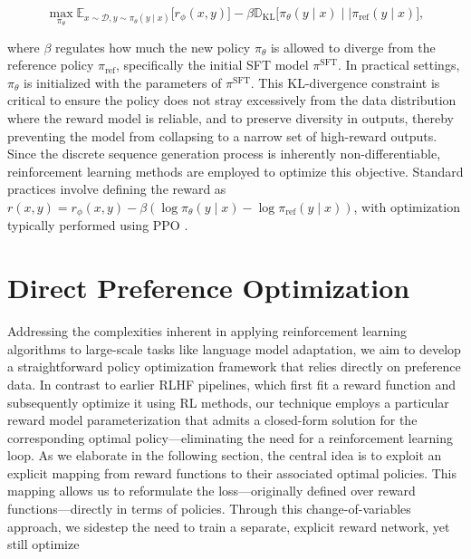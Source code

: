 \begin{equation}\label{eq:RL}
\max_{\pi_{\theta}}  \mathbb{E}_{x\sim \mathcal{D}, y\sim \pi_{\theta}(y \mid x)}\bigl[r_{\phi}(x, y)\bigr] - \beta\mathbb{D}_{\textrm{KL}}\bigl[\pi_{\theta}(y\mid x)\mid \mid \pi_\text{ref}(y\mid x)\bigr],
\end{equation}

where $\beta$ regulates how much the new policy $\pi_\theta$ is allowed to diverge from the reference policy $\pi_\text{ref}$, specifically the initial SFT model $\pi^\text{SFT}$. In practical settings, $\pi_\theta$ is initialized with the parameters of $\pi^\text{SFT}$. This KL-divergence constraint is critical to ensure the policy does not stray excessively from the data distribution where the reward model is reliable, and to preserve diversity in outputs, thereby preventing the model from collapsing to a narrow set of high-reward outputs. Since the discrete sequence generation process is inherently non-differentiable, reinforcement learning methods are employed to optimize this objective. Standard practices \citep{ziegler2020finetuning, stiennon2022learning, bai2022training, ouyang2022training} involve defining the reward as ${r(x, y) = r_{\phi}(x, y) -\beta (\log \pi_{\theta}(y\mid x) - \log \pi_\text{ref}(y\mid x))}$, with optimization typically performed using PPO \cite{schulman2017proximal}.

\section{Direct Preference Optimization}\label{sec:DPO}

Addressing the complexities inherent in applying reinforcement learning algorithms to large-scale tasks like language model adaptation, we aim to develop a straightforward policy optimization framework that relies directly on preference data. In contrast to earlier RLHF pipelines, which first fit a reward function and subsequently optimize it using RL methods, our technique employs a particular reward model parameterization that admits a closed-form solution for the corresponding optimal policy—eliminating the need for a reinforcement learning loop. As we elaborate in the following section, the central idea is to exploit an explicit mapping from reward functions to their associated optimal policies. This mapping allows us to reformulate the loss—originally defined over reward functions—directly in terms of policies. Through this change-of-variables approach, we sidestep the need to train a separate, explicit reward network, yet still optimize

